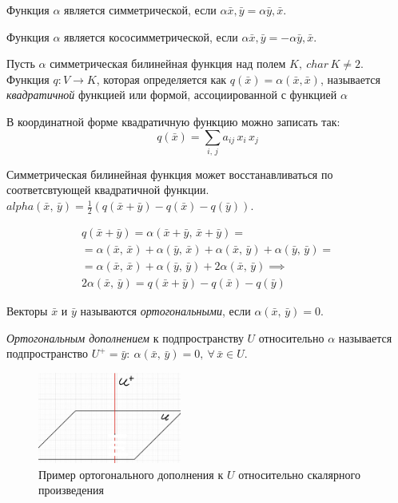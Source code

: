 Функция $\alpha$ является симметрической, если $\alpha{\bar{x}, \bar{y}} = \alpha{\bar{y}, \bar{x}}$.

Функция $\alpha$ является кососимметрической, если $\alpha{\bar{x}, \bar{y}} = -\alpha{\bar{y}, \bar{x}}$.

\begin{definition}
  Пусть $\alpha$ симметрическая билинейная функция над полем $K,~ char\, K \neq 2$. Функция $q: V \to K$, которая определяется как $q(\bar{x}) = \alpha(\bar{x}, \bar{x})$, называется \textit{квадратичной} функцией или формой, ассоциированной с функцией $\alpha$
\end{definition}

В координатной форме квадратичную функцию можно записать так:
$$
  q(\bar{x}) = \sum_{i,\, j} a_{ij}\,x_i\, x_j
$$

Симметрическая билинейная функция может восстанавливаться по соответсвтующей квадратичной функции.
$ alpha(\bar{x},\, \bar{y}) = \frac{1}{2} (q(\bar{x} + \bar{y}) - q(\bar{x}) - q(\bar{y}))$.
\begin{Proof}
  \begin{gather*}
    q(\bar{x} + \bar{y}) = \alpha(\bar{x} + \bar{y},\, \bar{x} + \bar{y}) = \\
    = \alpha(\bar{x}, \, \bar{x}) + \alpha(\bar{y},\, \bar{x}) + \alpha(\bar{x}, \, \bar{y}) + \alpha(\bar{y}, \, \bar{y}) = \\
    = \alpha(\bar{x}, \, \bar{x}) + \alpha(\bar{y}, \, \bar{y}) + 2\alpha(\bar{x}, \, \bar{y}) \implies \\
    2\alpha(\bar{x}, \, \bar{y}) = q(\bar{x} + \bar{y}) - q(\bar{x}) - q(\bar{y})
  \end{gather*}
\end{Proof}

\begin{definition}
  Векторы $\bar{x}$ и $\bar{y}$ называются \textit{ортогональными}, если $\alpha(\bar{x}, \, \bar{y}) = 0$.
\end{definition}

\begin{definition}
  \textit{Ортогональным дополнением} к подпространству $U$ относительно $\alpha$ называется подпространство $U^+ = {\bar{y}:~ \alpha(\bar{x}, \, \bar{y}) = 0, ~ \forall \, \bar{x} \in U}$.
\end{definition}

\begin{figure}[H]
  \centering
  \includegraphics[height = 3cm]{images/map_form_ortog.png}
  \caption{Пример ортогонального дополнения к $U$ относительно скалярного произведения}
\end{figure}

